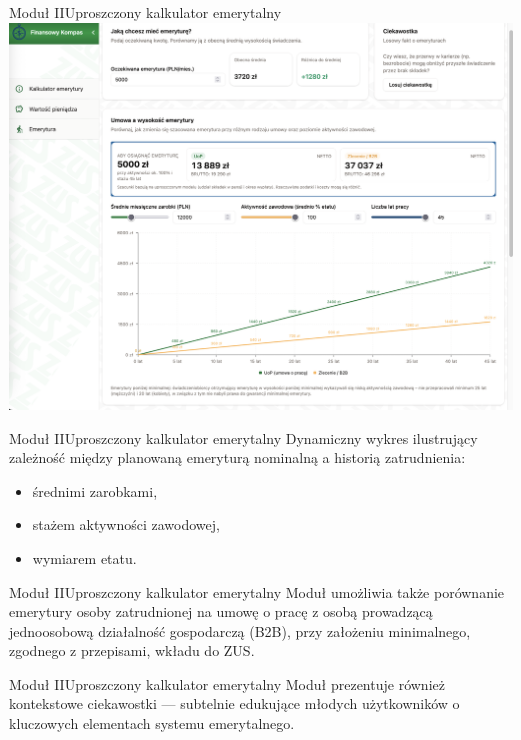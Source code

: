 \begin{frame}[t]{Moduł II}{Uproszczony kalkulator emerytalny}
  \includegraphics[width=.8\textwidth]{img/module_2_simple_pension_calculator}
\end{frame}

\begin{frame}[t]{Moduł II}{Uproszczony kalkulator emerytalny}
Dynamiczny wykres ilustrujący zależność między planowaną emeryturą nominalną a historią zatrudnienia:
\begin{itemize}
  \item średnimi zarobkami,
  \item stażem aktywności zawodowej,
  \item wymiarem etatu.
\end{itemize}
\end{frame}

\begin{frame}[t]{Moduł II}{Uproszczony kalkulator emerytalny}
Moduł umożliwia także porównanie emerytury osoby zatrudnionej na umowę o pracę
z osobą prowadzącą jednoosobową działalność gospodarczą (B2B),
przy założeniu minimalnego, zgodnego z przepisami, wkładu do ZUS.
\end{frame}

\begin{frame}[t]{Moduł II}{Uproszczony kalkulator emerytalny}
Moduł prezentuje również kontekstowe ciekawostki —
subtelnie edukujące młodych użytkowników o kluczowych elementach systemu emerytalnego.
\end{frame}

